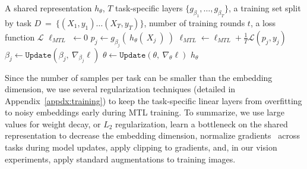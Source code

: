 \begin{algorithm}[h]
    \caption{Multitask Learning Training Loop}
    \label{alg:mtl_training}
    \begin{algorithmic}[1]
        A shared representation $h_\theta$, $T$ task-specific layers $\{g_{\beta_1}, \dots, g_{\beta_T}\}$, a training set split by task $D~=~\{(X_{1}, y_1 ) \dots (X_{T}, y_T )\}$, number of training rounds $t$, a loss function $\mathcal{L}$
            \State $\ell_{\textit{MTL}}$ $\gets 0$ 
                \State $p_j \gets g_{\beta_j} ( \: h_{\theta}(\: X_j \:) \:)$ 
                \State $\ell_{\textit{MTL}} \gets \ell_{\textit{MTL}} + \frac{1}{T} \mathcal{L}(p_{j}, y_j)$
            \EndFor
             
                \State $\beta_j \gets \texttt{Update} \left( \beta_j, \: \nabla_{\beta_j} \ell \right)$ 
            \EndFor
            \State $\theta \gets \texttt{Update} \left(\theta, \:  \nabla_{\theta} \ell \right)$ 
        \EndFor
        \Return $h_\theta$
    \end{algorithmic}
\end{algorithm}

Since the number of samples per task can be smaller than the embedding dimension, we use several regularization techniques (detailed in Appendix~\ref{appdx:training}) to keep the task-specific linear layers from overfitting to noisy embeddings early during MTL training. To summarize, we use large values for weight decay, or $L_{2}$ regularization, learn a bottleneck on the shared representation to decrease the embedding dimension, normalize gradients~\cite{chen-2018-gradnormalization} across tasks during model updates, apply clipping to gradients, and, in our vision experiments, apply standard augmentations to training images.



                
            
                
            


